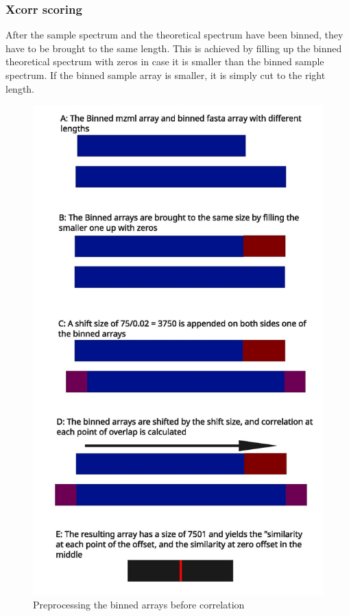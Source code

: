 \documentclass[11pt]{article}
\begin{document}
\subsubsection{Xcorr scoring}
After the sample spectrum and the theoretical spectrum have been binned, they have to be brought to the same length. This is achieved by filling up the binned theoretical spectrum with zeros in case it is smaller than the binned sample spectrum. If the binned sample array is smaller, it is simply cut to the right length. 
\begin{figure}
\includegraphics[width=\linewidth]{figs/crosscorr.jpg} 
\caption{Preprocessing the binned arrays before correlation}
\label{fig:corr}
\end{figure}
\end{document}
